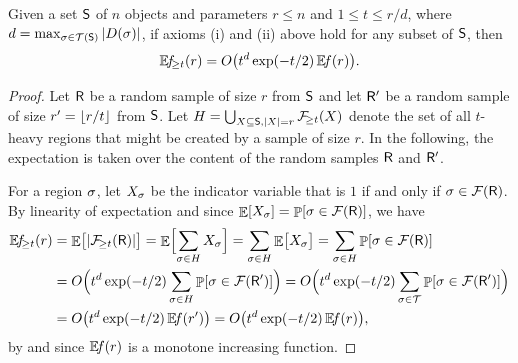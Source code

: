 \begin{lemma}
    Given a set $\mathsf{S}$ of $n$ objects and parameters $r \leq n$ and
    $1 \leq t \leq r/d$, where $d = \max_{\Trap \in \AllRegions\pth
       {\ObjSet}} \cardin{\DefSet{\Trap}}$, if axioms (i) and (ii)
    above hold for any subset of $\mathsf{S}$, then
    \begin{equation}
        \NumOfRegions{t}{r}  %
        = O\bigl( t^d
        \exp\pth{-t/2} \,  \NumOfRegionsZero{ r}
        \bigr).
        \eqlab{exponential:decay}
    \end{equation}    
\end{lemma}
\begin{proof}
    Let $\mathsf{R}$ be a random sample of size $r$ from $\mathsf{S}$ and
    let $\mathsf{R}'$ be a random sample of size $r' = \left\lfloor {r/t} \right\rfloor$ from
    $\mathsf{S}$.  Let $H = \bigcup_{X \subseteq \ObjSet, \cardin{X} = r}
    \RegionsHeavy{t}{X}$ denote the set of all $t$-heavy regions that
    might be created by a sample of size $r$.  In the following, the
    expectation is taken over the content of the random samples
    $\mathsf{R}$ and $\mathsf{R}'$.
    
    For a region $\sigma$, let $X_\sigma$ be the indicator variable that
    is $1$ if and only if $\Trap \in \RegionsSet{\Sample}$. By
    linearity of expectation and since $\Ex{X_\Trap} = \Prob{\Trap\in
       \RegionsSet{\Sample}}$, we have
    \begin{align*}
      \NumOfRegions{t}{r}%
      &=%
        \Ex{\bigl.\cardin{ \RegionsHeavy{t}{\Sample}} }%
        =%
        \Ex{\Bigl. \smash{\sum_{\Trap\in H} X_\Trap}} %
        =%
        \sum_{\Trap\in H} \Ex{\bigl.X_\Trap  } %
        =%
        \sum_{\Trap\in H} \Prob{\Trap\in \RegionsSet{\Sample}
        \MakesBig } %
      \\
      &=%
        O \Bigl( t^d \exp(-t/2) \sum_{\Trap\in H} \Prob{\Trap\in
        \RegionsSet{\SampleA}} \Bigr)%
        =%
        O \Bigl( t^d \exp(-t/2) \sum_{\Trap\in \AllRegions}
        \Prob{\Trap\in \RegionsSet{\SampleA}}\Bigr)%
      \\&%
      =%
      O \pth{ t^d \exp(-t/2)\, \NumOfRegionsZero{r'}}%
      =%
      O \pth{ t^d \exp(-t/2)\, \NumOfRegionsZero{r}},
    \end{align*}
    by  and since $\NumOfRegionsZero{r}$ is a
    monotone increasing function.
\end{proof}

